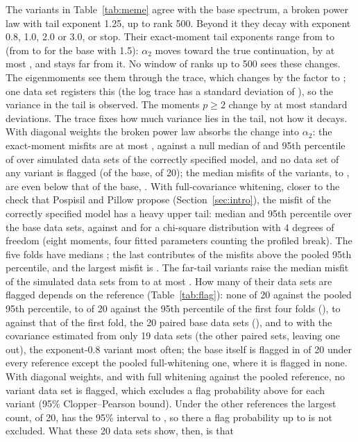 The variants in Table~\ref{tab:meme} agree with the base spectrum, a broken power law with tail exponent 1.25, up to rank 500. Beyond it they decay with exponent 0.8, 1.0, 2.0 or 3.0, or stop. Their exact-moment tail exponents range from \MemeTailMinA{} to \MemeTailMaxA{} (from \MemeTailMinB{} to \MemeTailMaxB{} for the base with 1.5): $\alpha_2$ moves toward the true continuation, by at most \MemeTailShiftMax{}, and stays far from it. No window of ranks up to 500 sees these changes. The eigenmoments see them through the trace, which changes by the factor \MemeTraceMin{} to \MemeTraceMax{}; one data set registers this (the log trace has a standard deviation of \MemeSDTrace{}), so the variance in the tail is observed. The moments $p \ge 2$ change by at most \MemeTailZMaxA{} standard deviations. The trace fixes how much variance lies in the tail, not how it decays. With diagonal weights the broken power law absorbs the change into $\alpha_2$: the exact-moment misfits are at most \MemeExactTailMisfitMax{}, against a null median of \MemeNullMedDiag{} and 95th percentile of \MemeNullQDiag{} over \MemeNB{} simulated data sets of the correctly specified model, and no data set of any variant is flagged (of the base, \MemeFlagDiagBaseN{} of 20); the median misfits of the variants, \MemeDiagVarMedMin{} to \MemeDiagVarMedMax{}, are even below that of the base, \MemeDiagBaseMed{}. With full-covariance whitening, closer to the check that Pospisil and Pillow propose (Section~\ref{sec:intro}), the misfit of the correctly specified model has a heavy upper tail: median \MemeNullMedFull{} and 95th percentile \MemeNullQFull{} over the \MemeNB{} base data sets, against \ChiFourMed{} and \ChiFourQ{} for a chi-square distribution with 4 degrees of freedom (eight moments, four fitted parameters counting the profiled break). The five folds have medians \MemeFullFoldMeds{}; the last contributes \MemeFullNullExceedLast{} of the \MemeFullNullExceedAll{} misfits above the pooled 95th percentile, and the largest misfit is \MemeFullNullMax{}. The far-tail variants raise the median misfit of the simulated data sets from \MemeFullBaseMed{} to at most \MemeFullVarMedMax{}. How many of their data sets are flagged depends on the reference (Table~\ref{tab:flag}): none of 20 against the pooled 95th percentile, \MemeFlagFFMinN{} to \MemeFlagFFMaxN{} of 20 against the 95th percentile of the first four folds (\MemeFullQFirstFour{}), \MemeFlagFOMinN{} to \MemeFlagFOMaxN{} against that of the first fold, the 20 paired base data sets (\MemeFullQFirst{}), and \MemeFlagLooMinN{} to \MemeFlagLooMaxN{} with the covariance estimated from only 19 data sets (the other paired sets, leaving one out), the exponent-0.8 variant most often; the base itself is flagged in \MemeFlagBaseWord{} of 20 under every reference except the pooled full-whitening one, where it is flagged in none. With diagonal weights, and with full whitening against the pooled reference, no variant data set is flagged, which excludes a flag probability above \MemeFlagZeroHi{} for each variant (95\% Clopper--Pearson bound). Under the other references the largest count, \MemeFlagMaxN{} of 20, has the 95\% interval \MemeFlagMaxLo{} to \MemeFlagMaxHi{}, so there a flag probability up to \MemeFlagMaxHi{} is not excluded. What these 20 data sets show, then, is that 